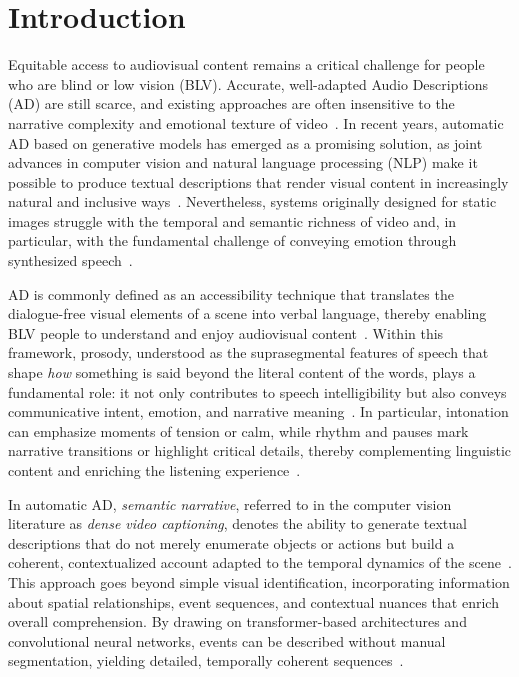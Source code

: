\documentclass[pdflatex,iicol,sn-mathphys-num]{sn-jnl}%
\theoremstyle{thmstyleone}%
\theoremstyle{thmstyletwo}%
\theoremstyle{thmstylethree}%
\begin{document}
\section{Introduction}\label{sec1}

Equitable access to audiovisual content remains a critical challenge for people who are blind or low vision (BLV). Accurate, well-adapted Audio Descriptions (AD) are still scarce, and existing approaches are often insensitive to the narrative complexity and emotional texture of video~\cite{Sharma2023,Islam2021}. In recent years, automatic AD based on generative models has emerged as a promising solution, as joint advances in computer vision and natural language processing (NLP) make it possible to produce textual descriptions that render visual content in increasingly natural and inclusive ways~\cite{Shen2024a,Yuan2025}. Nevertheless, systems originally designed for static images struggle with the temporal and semantic richness of video and, in particular, with the fundamental challenge of conveying emotion through synthesized speech~\cite{Taha2024,Cusworth2024}.

AD is commonly defined as an accessibility technique that translates the dialogue-free visual elements of a scene into verbal language, thereby enabling BLV people to understand and enjoy audiovisual content~\cite{Shen2024a,Yucel2025}. Within this framework, prosody, understood as the suprasegmental features of speech that shape \textit{how} something is said beyond the literal content of the words, plays a fundamental role: it not only contributes to speech intelligibility but also conveys communicative intent, emotion, and narrative meaning~\cite{Iavarone2024,Gu2024}. In particular, intonation can emphasize moments of tension or calm, while rhythm and pauses mark narrative transitions or highlight critical details, thereby complementing linguistic content and enriching the listening experience~\cite{Nussbaum2023,Iavarone2024}.

In automatic AD, \textit{semantic narrative}, referred to in the computer vision literature as \textit{dense video captioning}, denotes the ability to generate textual descriptions that do not merely enumerate objects or actions but build a coherent, contextualized account adapted to the temporal dynamics of the scene~\cite{Zhou2018,Li2018}. This approach goes beyond simple visual identification, incorporating information about spatial relationships, event sequences, and contextual nuances that enrich overall comprehension. By drawing on transformer-based architectures and convolutional neural networks, events can be described without manual segmentation, yielding detailed, temporally coherent sequences~\cite{Zhu2019,Yang2023}.
\end{document}
